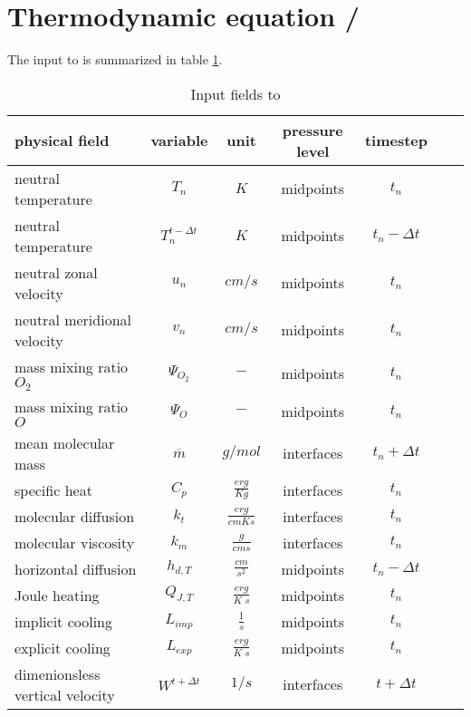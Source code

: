 %
\section{Thermodynamic equation / }\label{cap:dt}
%
The input to  is summarized in table
\ref{tab:input_dt}.
%
\begin{table}[tb]
\begin{tabular}{|p{3.5cm} ||c|c|c|c|c|c|} \hline
physical field               & variable        & unit&pressure
level& timestep
\\ \hline \hline
%
neutral temperature &       $T_n$              & $K$   &  midpoints & $t_n$\\
neutral temperature &       $T_n^{t-\Delta t}$ & $K$   &  midpoints & $t_n-\Delta t$\\
neutral zonal velocity&     $u_n$     & $cm/s$   &  midpoints & $t_n$\\
neutral meridional velocity & $v_n$   & $cm/s$   &  midpoints & $t_n$\\
mass mixing ratio $O_2$&       {$\Psi_{O_2}$}     & $-$   & midpoints  & $t_n$\\
mass mixing ratio $O$&       {$\Psi_{O}$}     & $-$   &  midpoints & $t_n$\\
mean molecular mass&       {$\overline{m}$}     & $g/mol$   & interfaces  &$t_n + \Delta t$ \\
specific heat&       {$C_p$}     & $\frac{erg}{K g}$   & interfaces   &  $t_n$\\
molecular diffusion&       $k_t$     & $\frac{erg}{cm K s}$   & interfaces  & $t_n$ \\
molecular viscosity&       $k_m$     & $\frac{g}{cm s}$   & interfaces  & $t_n$ \\
horizontal diffusion&       {$h_{d,T}$}     & $\frac{cm}{s^2}$   & midpoints  & $t_n-\Delta t$\\
Joule heating &       {$Q_{J,T}$}     & $\frac{erg}{K\; s}$   & midpoints  &  $t_n$\\
implicit cooling &       {$L_{imp}$}     & $\frac{1}{s}$   & midpoints  & $t_n$\\
explicit cooling &       {$L_{exp}$}     & $\frac{erg}{K \; s}$   & midpoints  & $t_n$\\
dimenionsless vertical velocity& $W^{t+\Delta t}$& $1/s$   &
interfaces& $t+\Delta t$
 \\ \hline
\end{tabular}
\caption{Input fields to } \label{tab:input_dt}
\end{table}
